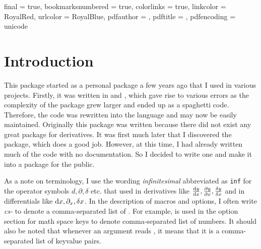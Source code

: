 \hypersetup
{
	final = true,
	bookmarksnumbered = true,
	colorlinks = true,
	linkcolor = RoyalRed,
	urlcolor = RoyalBlue,
	pdfauthor = \forfatter,
	pdftitle = \titel,
	pdfencoding = unicode
}

\listfiles

\setlength{\marginparwidth}{126pt} %
\setlength{\marginparpush}{0pt} %

\makeindex[name = option, title = Index of Options, intoc=true]
\makeindex[name = macro, title = Index of Commands, intoc=true]


\def\indexspace{}



	
	\forside
	
	\clearpage
	\tableofcontents
	
	\clearpage
	\section{Introduction}
	This package started as a personal package a few years ago that I used in various projects. Firstly, it was written in \tex{} and \latex, which gave rise to various errors as the complexity of the package grew larger and ended up as a spaghetti code. Therefore, the code was rewritten into the  language and may now be easily maintained. Originally this package was written because there did not exist any great package for derivatives. It was first much later that I discovered the  package, which does a good job. However, at this time, I had already written much of the code with no documentation. So I decided to write one and make it into a package for the public.
	
	As a note on terminology, I use the wording \emph{infinitesimal} abbreviated as \texttt{inf} for the operator symbols $d, \partial, \delta$ etc. that used in derivatives like $\odv{y}{x}, \pdv{y}{x}, \fdv{y}{x}$ and in differentials like $\odif{x}, \pdif{x}, \fdif{x}$. In the description of macros and options, I often write \emph{cs-} to denote a comma-separated list of . For example,  is used in the option section for math space keys to denote comma-separated list of numbers. It should also be noted that whenever an argument reads , it means that it is a comma-separated list of keyvalue pairs.
	
